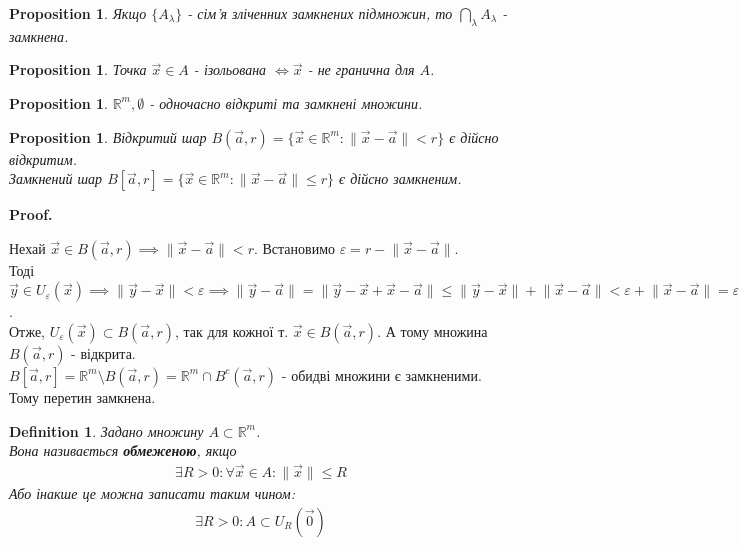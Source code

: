 \documentclass[a4paper, 10pt]{article}
\makeatletter
\def\huge{\displaystyle}
\def\qed{$\blacksquare$}
\theoremstyle{theoremdd}
\theoremstyle{theoremdd}
\theoremstyle{theoremdd}
\newtheorem{definition}[theorem]{Definition}
\theoremstyle{theoremdd}
\theoremstyle{theoremdd}
\theoremstyle{theoremdd}
\newtheorem{proposition}[theorem]{Proposition}
\theoremstyle{theoremdd}
\theoremstyle{theoremdd}
\theoremstyle{theoremdd}
\renewenvironment{proof}[1][Proof.\\]{\par
\pushQED{\hfill \qed}%
\normalfont \topsep6\p@\@plus6\p@\relax
\trivlist
\item\relax
{\bfseries
#1\@addpunct{.}}\hspace\labelsep\ignorespaces
}{%
\popQED\endtrivlist\@endpefalse
}
\newcommand\Norm[1]{\lVert#1\rVert}
\makeatother
\begin{document}
\begin{proposition}
Якщо $\{A_\lambda\}$ - сім'я зліченних замкнених підмножин, то $\huge\bigcap_\lambda A_\lambda$ - замкнена.
\end{proposition}

\begin{proposition}
Точка $\vec{x} \in A$ - ізольована $\iff \vec{x}$ - не гранична для $A$.
\end{proposition}

\begin{proposition}
$\mathbb{R}^m, \emptyset$ - одночасно відкриті та замкнені множини.
\end{proposition}

\begin{proposition}
Відкритий шар $B(\vec{a},r) = \{ \vec{x} \in \mathbb{R}^m: \lVert \vec{x}-\vec{a} \rVert < r \}$ є дійсно відкритим.\\
Замкнений шар $B[\vec{a},r] = \{ \vec{x} \in \mathbb{R}^m: \lVert \vec{x}-\vec{a} \rVert \leq r \}$ є дійсно замкненим.
\end{proposition}

\begin{proof}
Нехай $\vec{x} \in B(\vec{a},r) \implies \lVert \vec{x} - \vec{a} \rVert < r$. Встановимо $\varepsilon = r - \lVert \vec{x} - \vec{a} \rVert$.\\
Тоді $\vec{y} \in U_\varepsilon(\vec{x}) \implies \lVert \vec{y} - \vec{x} \rVert < \varepsilon \implies \lVert \vec{y} - \vec{a} \rVert = \lVert \vec{y} - \vec{x} + \vec{x} - \vec{a} \rVert \leq \lVert \vec{y} - \vec{x} \rVert + \lVert \vec{x} - \vec{a} \rVert < \varepsilon + \lVert \vec{x} - \vec{a} \rVert = \varepsilon \implies \vec{y} \in B(\vec{a},r)$. \\
Отже, $U_\varepsilon (\vec{x}) \subset B(\vec{a},r)$, так для кожної т. $\vec{x} \in B(\vec{a},r)$. А тому множина $B(\vec{a},r)$ - відкрита.
\bigskip \\
$B[\vec{a}, r] = \mathbb{R}^m \setminus B(\vec{a}, r) = \mathbb{R}^m \cap B^c(\vec{a},r)$ - обидві множини є замкненими. Тому перетин замкнена.
\end{proof}

\begin{definition}
Задано множину $A \subset \mathbb{R}^m$.\\
Вона називається \textbf{обмеженою}, якщо
\begin{align*}
\exists R > 0: \forall \vec{x} \in A: \Norm{\vec{x}} \leq R
\end{align*}
Або інакше це можна записати таким чином:
\begin{align*}
\exists R > 0: A \subset U_R(\vec{0})
\end{align*}
\end{definition}
\end{document}
